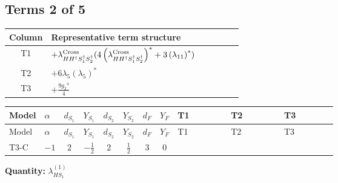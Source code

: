 \documentclass[8pt]{article}
\begin{document}
\begin{landscape}
\subsection*{Terms 2 of 5}
\begin{center}
\begin{tabular}{@{}c >{\raggedright\arraybackslash}p{0.82\linewidth}@{}}
\toprule
Column & Representative term structure \\
\midrule
T1 & \(\displaystyle +{\lambda_{H H^\dagger S_1^\dagger S_2^\dagger}^{\rm Cross}} (4 \left({\lambda_{H H^\dagger S_1^\dagger S_2^\dagger}^{\rm Cross}}\right)^{*}+3 \left({\lambda_{11}}\right)^{*})\) \\
\midrule
T2 & \(\displaystyle +6 {\lambda_5} \left({\lambda_5}\right)^{*}\) \\
\midrule
T3 & \(\displaystyle +\frac{9 {g_2}^4}{4}\) \\
\midrule
\bottomrule
\end{tabular}
\end{center}
\smallskip
\tiny
\begin{longtable}{@{}llcccccc >{\raggedright\arraybackslash}p{0.21\linewidth} >{\raggedright\arraybackslash}p{0.21\linewidth} >{\raggedright\arraybackslash}p{0.21\linewidth}@{}}
\toprule
Model & $\alpha$ & $d_{S_1}$ & $Y_{S_1}$ & $d_{S_2}$ & $Y_{S_2}$ & $d_F$ & $Y_F$ & T1 & T2 & T3 \\
\midrule
\endfirsthead
\toprule
Model & $\alpha$ & $d_{S_1}$ & $Y_{S_1}$ & $d_{S_2}$ & $Y_{S_2}$ & $d_F$ & $Y_F$ & T1 & T2 & T3 \\
\midrule
\endhead
T3-C & $-1$ & $2$ & $-\frac{1}{2}$ & $2$ & $\frac{1}{2}$ & $3$ & $0$ & \scriptsize\adjustbox{max width=\linewidth}{$\begin{gathered} +{\lambda_{H H^\dagger S_1^\dagger S_2^\dagger}^{\rm Cross}} (4 \left({\lambda_{H H^\dagger S_1^\dagger S_2^\dagger}^{\rm Cross}}\right)^{*}+3 \left({\lambda_{11}}\right)^{*})\end{gathered}$} & \scriptsize\adjustbox{max width=\linewidth}{$\begin{gathered} +6 {\lambda_5} \left({\lambda_5}\right)^{*}\end{gathered}$} & \scriptsize\adjustbox{max width=\linewidth}{$\begin{gathered} +\frac{9 {g_2}^4}{4}\end{gathered}$} \\
\midrule
\bottomrule
\end{longtable}
\clearpage
\noindent\textbf{Quantity: }$\lambda_{HS_1}^{(1)}$\par\smallskip

\end{landscape}
\end{document}
